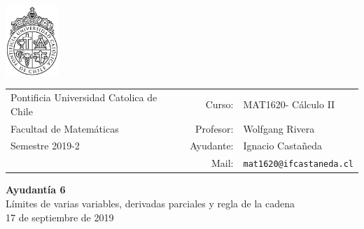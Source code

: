 \documentclass[12pt]{article}
\makeatletter
\newcommand{\ayudantia}{{\sc Ayudantía 6}}
\newcommand{\tituloayu}{Límites de varias variables, derivadas parciales y regla de la cadena}
\newcommand{\fecha}{17 de septiembre de 2019}
\newcommand{\sigla}{MAT1620}
\newcommand{\nombre}{Cálculo II}
\newcommand{\profesor}{Wolfgang Rivera}
\newcommand{\ano}{2019}
\newcommand{\semestre}{2}
\newcommand{\mail}{mat1620@ifcastaneda.cl}
\makeatother
\begin{document}
\thispagestyle{empty}

\begin{minipage}{2cm}
	\includegraphics[width=2cm]{../../../../img/logo.pdf}
	\vspace{0.5cm}
\end{minipage}
\begin{minipage}{\linewidth}
	\begin{tabular}{lrl}
		{\scriptsize\sc Pontificia Universidad Catolica de Chile} & \hspace*{0.7in}Curso: &
		\sigla  - \nombre\\
		{\sc Facultad de Matemáticas}&
		Profesor: & \profesor \\
		{\sc Semestre \ano-\semestre} & Ayudante: & {Ignacio Castañeda}\\
		& {Mail:} & \texttt{\mail}
	\end{tabular}
\end{minipage}

\vspace{-10mm}
\begin{center}
	{\LARGE\bf \ayudantia}\\
	\vspace{0.1cm}
	{\tituloayu}\\
	\vspace{0.1cm}
	\fecha\\
	\vspace{0.4cm}
\end{center}
\end{document}
